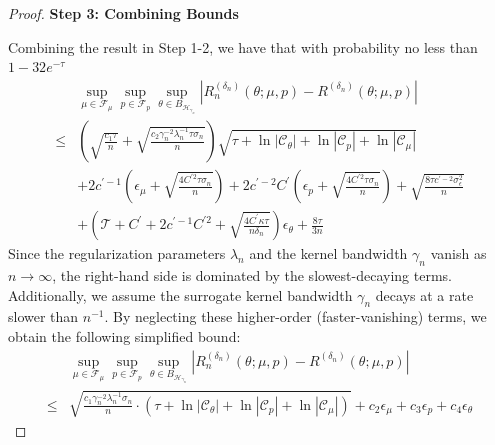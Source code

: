 \begin{proof}
\noindent\textbf{Step 3: Combining Bounds}


\noindent Combining the result in Step 1-2, we have that with probability no less than $1-32e^{-\tau}$
\begin{align*}
    &\sup_{\mu\in\mathcal{F}_\mu}\sup_{p\in\mathcal{F}_p}\sup_{\theta\in B_{\mathcal{H}_{\gamma_n}}}\left| R_n^{({\delta_n})}(\theta;\mu,p) - R^{({\delta_n})}(\theta;\mu,p)\right|\\
    \leq &  \left(\sqrt{\frac{c_1\tau}{n}}+
    \sqrt{\frac{ c_2\gamma_n^{-2}\lambda_n^{-1}\tau\sigma_n}{n}} \right)\sqrt{\tau +\ln|\mathcal{C}_\theta|+\ln|\mathcal{C}_p|+\ln|\mathcal{C}_\mu|} \\
&  + 2c^{\prime-1}\left(\epsilon_\mu + \sqrt{\frac{4C^{\prime2}\tau\sigma_n}{n}}\right) + 2c^{\prime-2}C^{\prime}\left(\epsilon_p+\sqrt{\frac{4C^{\prime2}\tau\sigma_n}{n}}\right)  + \sqrt{\frac{8\tau c^{\prime-2} \sigma_\epsilon^2}{n}}\\
& + \left(\mathcal{T}+C^\prime+2c^{\prime-1}C^{\prime2}+\sqrt{\frac{4C^\prime \kappa \tau}{n\delta_n}}\right)\epsilon_\theta + \frac{8\tau}{3n}
\end{align*}
Since the regularization parameters $\lambda_n$ and the kernel bandwidth $\gamma_n$ vanish as $n \to \infty$, the right-hand side is dominated by the slowest-decaying terms. Additionally, we assume the surrogate kernel bandwidth $\gamma_n$ decays at a rate slower than $n^{-1}$. By neglecting these higher-order (faster-vanishing) terms, we obtain the following simplified bound:
\begin{align*}
    &\sup_{\mu\in\mathcal{F}_\mu}\sup_{p\in\mathcal{F}_p}\sup_{\theta\in B_{\mathcal{H}_{\gamma_n}}}\left| R_n^{({\delta_n})}(\theta;\mu,p) - R^{({\delta_n})}(\theta;\mu,p)\right|\\
    \leq &  \sqrt{\frac{ c_1\gamma_n^{-2}\lambda_n^{-1}\sigma_n}{n}\cdot\left(\tau +\ln|\mathcal{C}_\theta|+\ln|\mathcal{C}_p|+\ln|\mathcal{C}_\mu|\right)} + c_2\epsilon_\mu + c_3\epsilon_p + c_4\epsilon_\theta
\end{align*}


\end{proof}




